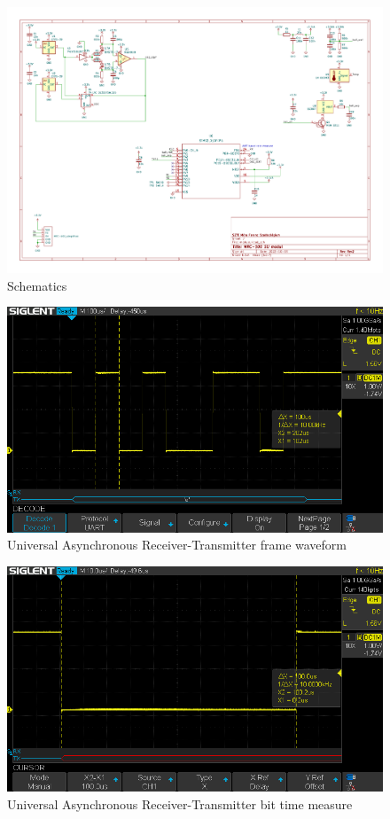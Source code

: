 \documentclass[10pt]{datasheet}
\begin{document}
\begin{figure}
	\centering
	\includegraphics[width=1.2\textwidth,angle = 90]{sch}
	\caption{Schematics}
\end{figure}


\begin{figure}
	\centering
	\includegraphics[width=1\textwidth]{SDS1}
	\caption{Universal Asynchronous Receiver-Transmitter frame waveform}
\end{figure}


\begin{figure}
	\centering
	\includegraphics[width=1\textwidth]{SDS2}
	\caption{Universal Asynchronous Receiver-Transmitter bit time measure}
\end{figure}
\end{document}
